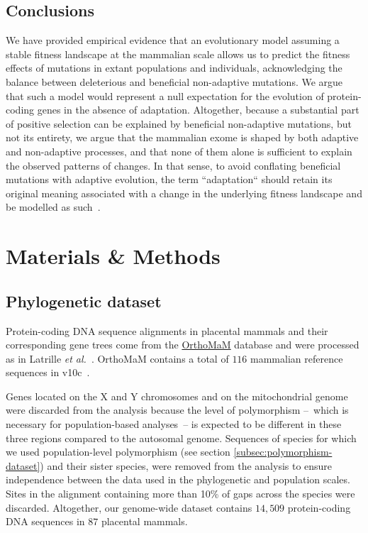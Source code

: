 \documentclass{article}
\begin{document}
    \subsection*{Conclusions}

    We have provided empirical evidence that an evolutionary model assuming a stable fitness landscape at the mammalian scale allows us to predict the fitness effects of mutations in extant populations and individuals, acknowledging the balance between deleterious and beneficial non-adaptive mutations.
    We argue that such a model would represent a null expectation for the evolution of protein-coding genes in the absence of adaptation.
    Altogether, because a substantial part of positive selection can be explained by beneficial non-adaptive mutations, but not its entirety, we argue that the mammalian exome is shaped by both adaptive and non-adaptive processes, and that none of them alone is sufficient to explain the observed patterns of changes.
    In that sense, to avoid conflating beneficial mutations with adaptive evolution, the term ``adaptation`` should retain its original meaning associated with a change in the underlying fitness landscape and be modelled as such~\cite{mustonen_fitness_2009, mustonen_fitness_2010}.

    \newpage
    \section{Materials \& Methods}
    \label{sec:methods}

    \subsection{Phylogenetic dataset}\label{subsec:phylo-dataset}

    Protein-coding DNA sequence alignments in placental mammals and their corresponding gene trees come from the \href{https://www.orthomam.univ-montp2.fr}{OrthoMaM} database and were processed as in Latrille \textit{et al.}~\cite{latrille_genes_2023}.
    OrthoMaM contains a total of $116$ mammalian reference sequences in v10c~\cite{ranwez_orthomam_2007, douzery_orthomam_2014, scornavacca_orthomam_2019}.

    Genes located on the X and Y chromosomes and on the mitochondrial genome were discarded from the analysis because the level of polymorphism –~which is necessary for population-based analyses~– is expected to be different in these three regions compared to the autosomal genome.
    Sequences of species for which we used population-level polymorphism (see section \ref{subsec:polymorphism-dataset}) and their sister species, were removed from the analysis to ensure independence between the data used in the phylogenetic and population scales.
    Sites in the alignment containing more than 10\% of gaps across the species were discarded.
    Altogether, our genome-wide dataset contains $14,509$ protein-coding DNA sequences in $87$ placental mammals.
\end{document}
